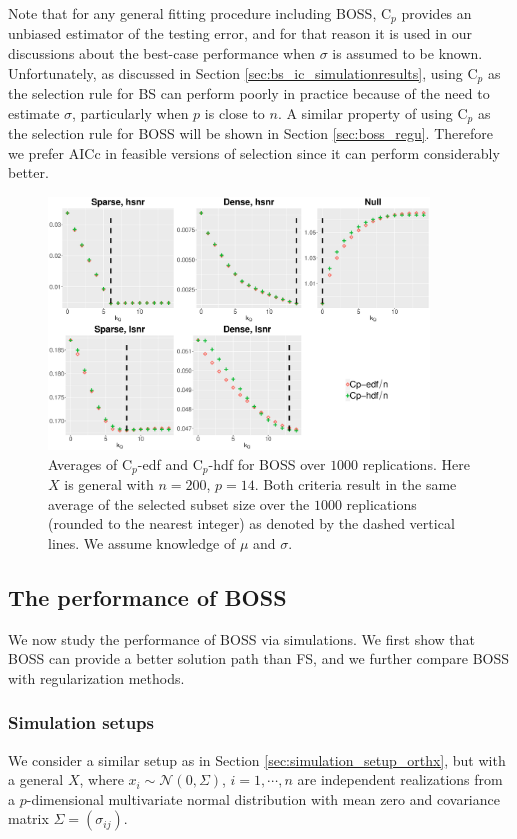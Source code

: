 Note that for any general fitting procedure including BOSS, C$_p$ provides an unbiased estimator of the testing error, and for that reason it is used in our discussions about the best-case performance when $\sigma$ is assumed to be known. Unfortunately, as discussed in Section \ref{sec:bs_ic_simulationresults}, using C$_p$ as the selection rule for BS can perform poorly in practice because of the need to estimate $\sigma$, particularly when $p$ is close to $n$. A similar property of using C$_p$ as the selection rule for BOSS will be shown in Section \ref{sec:boss_regu}. Therefore we prefer AICc in feasible versions of selection since it can perform considerably better. 

\begin{figure}[ht!]
	\centering
	\includegraphics[width=0.9\textwidth]{figures/cp_edf_hdf_boss.eps}
	\caption{Averages of C$_p$-edf and C$_p$-hdf for BOSS over $1000$ replications. Here $X$ is general with $n=200$, $p=14$. Both criteria result in the same average of the selected subset size over the $1000$ replications (rounded to the nearest integer) as denoted by the dashed vertical lines. We assume knowledge of $\mu$ and $\sigma$.}
	\label{fig:boss_cp_edf_hdf}
\end{figure}

\subsection{The performance of BOSS}
We now study the performance of BOSS via simulations. We first show that BOSS can provide a better solution path than FS, and we further compare BOSS with regularization methods. 

\subsubsection{Simulation setups}
\label{sec:simulation_setup_generalx}
We consider a similar setup as in Section \ref{sec:simulation_setup_orthx}, but with a general $X$, where  $x_i\sim \mathcal{N}(0,\Sigma)$, $i=1,\cdots,n$ are independent realizations from a $p$-dimensional multivariate normal distribution with mean zero and covariance matrix $\Sigma=(\sigma_{ij})$. 

